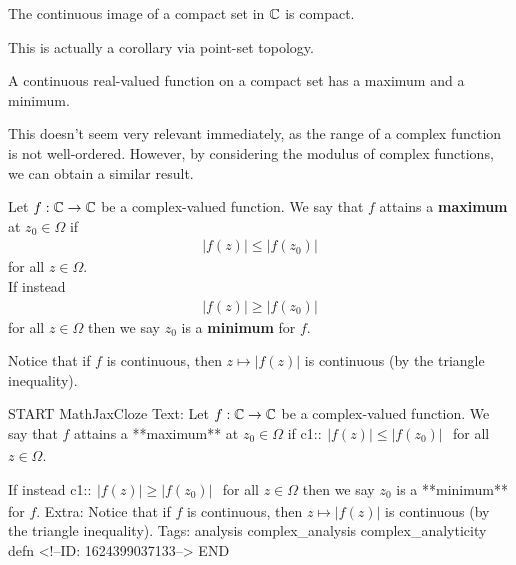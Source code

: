 \documentclass{memoir}
\begin{document}
\begin{thm}
	The continuous image of a compact set in \(\mathbb{C}\) is compact.
\end{thm}
This is actually a corollary via point-set topology.

\begin{cor}
	A continuous real-valued function on a compact set has a maximum and a minimum.
\end{cor}
This doesn't seem very relevant immediately, as the range of a complex function is not well-ordered. However, by considering the modulus of complex functions, we can obtain a similar result.

\begin{defn}
	Let \(f:\mathbb{C}\to \mathbb{C}\) be a complex-valued function. We say that \(f\) attains a \textbf{maximum} at \(z_0 \in \Omega \) if
	\begin{align*}
		\left| f(z) \right| \leq \left| f(z_0) \right| 
	\end{align*}for all \(z \in \Omega \).\\

	If instead
	\begin{align*}
		\left| f(z) \right| \geq \left| f(z_0) \right| 
	\end{align*} for all \(z\in \Omega \) then we say \(z_0\) is a \textbf{minimum} for \(f\).
\end{defn}
Notice that if \(f\) is continuous, then \(z\mapsto \left| f(z) \right| \) is continuous (by the triangle inequality).

\begin{anki}
START
MathJaxCloze
Text: Let \(f:\mathbb{C}\to \mathbb{C}\) be a complex-valued function. We say that \(f\) attains a **maximum** at \(z_0 \in \Omega \) if
{{c1::\(\begin{align*}
        	\left| f(z) \right| \leq \left| f(z_0) \right| 
        \end{align*}\)}}
for all \(z \in \Omega \).

If instead
{{c1::\(\begin{align*}
      \left| f(z) \right| \geq \left| f(z_0) \right| 
      \end{align*}\)}}
for all \(z\in \Omega \) then we say \(z_0\) is a **minimum** for \(f\).
Extra: Notice that if \(f\) is continuous, then \(z\mapsto \left| f(z) \right| \) is continuous (by the triangle inequality).
Tags: analysis complex_analysis complex_analyticity defn
<!--ID: 1624399037133-->
END
\end{anki}
\end{document}
